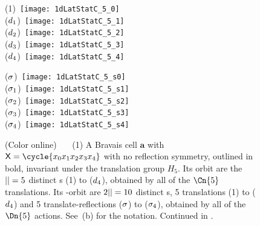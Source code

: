 \begin{figure} \begin{center}
  \begin{minipage}[b]{0.33\textwidth}\begin{center}
{(1)}~\texttt{[image: 1dLatStatC\_5\_0]}
\\
{($d_1$)}~\texttt{[image: 1dLatStatC\_5\_1]}
\\
{($d_2$)}~\texttt{[image: 1dLatStatC\_5\_2]}
\\
{($d_3$)}~\texttt{[image: 1dLatStatC\_5\_3]}
\\
{($d_4$)}~\texttt{[image: 1dLatStatC\_5\_4]}
  \end{center}\end{minipage}
\qquad\quad
  \begin{minipage}[b]{0.33\textwidth}\begin{center}
{($\sigma$)}~\texttt{[image: 1dLatStatC\_5\_s0]}
\\
{($\sigma_1$)}~\texttt{[image: 1dLatStatC\_5\_s1]}
\\
{($\sigma_2$)}~\texttt{[image: 1dLatStatC\_5\_s2]}
\\
{($\sigma_3$)}~\texttt{[image: 1dLatStatC\_5\_s3]}
\\
{($\sigma_4$)}~\texttt{[image: 1dLatStatC\_5\_s4]}

  \end{center} \end{minipage}
  \end{center}
  \caption{\label{fig:1dLatStatC_5}
(Color online)~~~
(1)
A Bravais cell $\mathbf{a}$ with
{\lattstate}
\(\Xx=\cycle{\ssp_0 \ssp_1 \ssp_2 \ssp_3 \ssp_4}\)
with no reflection symmetry, outlined in bold, invariant under the
translation group $H_{5}$.
Its \Cn{\infty} orbit are the ${||}=5$ distinct {\lattstate}s (1) to
($d_4$), obtained by all of the $\Cn{5}$ translations.
Its \Dn{\infty}-orbit are $2{||}=10$ distinct {\lattstate}s,
5 translations (1) to ($d_4$)
and
5 translate-reflections ($\sigma$) to ($\sigma_4$), obtained by
all of the $\Dn{5}$ actions.
See \,(b) for the notation.
Continued in .
          }
\end{figure}

